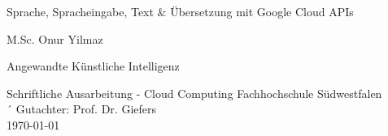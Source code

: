 \documentclass[12pt,a4paper]{article}
\begin{document}
	
		
		\begin{titlepage}
			\begin{center}
				\vspace*{1cm}
				\Huge
				Sprache, Spracheingabe, Text \& Übersetzung mit Google Cloud APIs
				
				
				\vspace{1.5cm}
				\LARGE
				M.Sc. Onur Yilmaz
				
				\vspace{1.5cm}
				\Large
				Angewandte Künstliche Intelligenz
				
				\vfill
				
				Schriftliche Ausarbeitung - Cloud Computing
				\vspace{0.5cm}
				\large
				Fachhochschule Südwestfalen
				\vspace{0.8cm}
				\Large
				\\´
				Gutachter: Prof. Dr. Giefers
				\\
				\vspace{0.5cm}
				\large		
				\today
			\end{center}
		\end{titlepage}

\thispagestyle{empty}
\tableofcontents

\newpage
\end{document}
